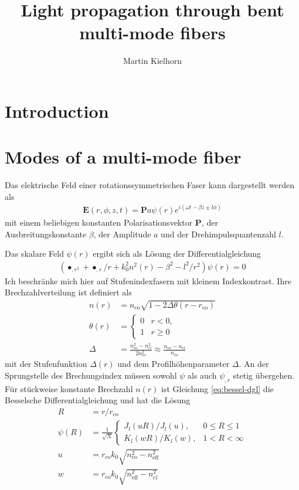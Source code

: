 \documentclass{article}
\title{Light propagation through bent multi-mode fibers} %
\author{Martin Kielhorn}
\newcommand{\vect}[1]{\mathbf{#1}}
\def\E{\vect E}
\def\P{\vect P}
\def\({\left(}
\def\){\right)}
\newcommand{\nco}{n_\textrm{co}}
\newcommand{\rco}{r_\textrm{co}}
\newcommand{\neff}{n_\textrm{eff}}
\newcommand{\ncl}{n_\textrm{cl}}
\begin{document}
\maketitle
\section{Introduction}
\section{Modes of a multi-mode fiber}
Das elektrische Feld einer rotationssymmetrischen Faser kann dargestellt werden als
\begin{align}
\E(r,\phi,z,t)=\P a \psi(r) e^{i(\omega t-\beta z \pm l \phi)}
\end{align}
mit einem beliebigen konstanten Polarisationsvektor $\P$, der
Ausbreitungskonstante $\beta$, der Amplitude $a$ und der
Drehimpulsquantenzahl $l$.

Das skalare Feld $\psi(r)$ ergibt sich als L\"osung der Differentialgleichung
\begin{align}
\label{eq:bessel-dgl}
\(\bullet_{,r^2} + \bullet_{,r}/r +k_0^2 n^2(r) -\beta^2 -l^2/r^2\)\psi(r) = 0
\end{align}
Ich beschr\"anke mich hier auf Stufenindexfasern mit kleinem
Indexkontrast. Ihre Brechzahlverteilung ist definiert als
\begin{align}
n(r)&=\nco\sqrt{1-2\Delta\theta(r-\rco)} \\
\theta(r)&=\begin{cases}0 &r<0,\\ 1 & r\ge 0\end{cases} \\
\Delta &= \frac{\nco^2-\ncl^2}{2\nco^2} \approx \frac{\nco-\ncl}{\nco}
\end{align}
mit der Stufenfunktion $\Delta(r)$ und dem Profilh\"ohenparameter
$\Delta$. An der Sprungstelle des Brechungsindex m\"ussen sowohl
$\psi$ als auch $\psi_{,r}$ stetig \"ubergehen. F\"ur st\"uckweise konstante Brechzahl $n(r)$ ist Gleichung \eqref{eq:bessel-dgl} die Besselsche Differentialgleichung und hat die L\"osung
\begin{align}
  R&=r/\rco\\
  \psi(R)&=\frac{1}{\sqrt{N}}\begin{cases}
  J_l(uR)/J_l(u), & 0\le R\le 1\\
  K_l(wR)/K_l(w), & 1<R<\infty 
  \end{cases}\label{eq:psi}\\
  u &= \rco k_0 \sqrt{\nco^2-\neff^2} \\
  w &= \rco k_0 \sqrt{\neff^2-\ncl^2} 
\end{align}
\end{document}
